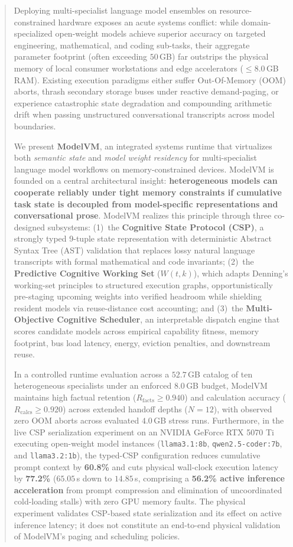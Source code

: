 \begin{abstract}
Deploying multi-specialist language model ensembles on resource-constrained hardware exposes an acute systems conflict: while domain-specialized open-weight models achieve superior accuracy on targeted engineering, mathematical, and coding sub-tasks, their aggregate parameter footprint (often exceeding $50$\,GB) far outstrips the physical memory of local consumer workstations and edge accelerators ($\le 8.0$\,GB RAM). Existing execution paradigms either suffer Out-Of-Memory (OOM) aborts, thrash secondary storage buses under reactive demand-paging, or experience catastrophic state degradation and compounding arithmetic drift when passing unstructured conversational transcripts across model boundaries. 

We present \textbf{ModelVM}, an integrated systems runtime that virtualizes both \textit{semantic state} and \textit{model weight residency} for multi-specialist language model workflows on memory-constrained devices. ModelVM is founded on a central architectural insight: \textbf{heterogeneous models can cooperate reliably under tight memory constraints if cumulative task state is decoupled from model-specific representations and conversational prose}. ModelVM realizes this principle through three co-designed subsystems: (1)~the \textbf{Cognitive State Protocol (CSP)}, a strongly typed 9-tuple state representation with deterministic Abstract Syntax Tree (AST) validation that replaces lossy natural language transcripts with formal mathematical and code invariants; (2)~the \textbf{Predictive Cognitive Working Set} ($W(t, k)$), which adapts Denning's working-set principles to structured execution graphs, opportunistically pre-staging upcoming weights into verified headroom while shielding resident models via reuse-distance cost accounting; and (3)~the \textbf{Multi-Objective Cognitive Scheduler}, an interpretable dispatch engine that scores candidate models across empirical capability fitness, memory footprint, bus load latency, energy, eviction penalties, and downstream reuse. 

In a controlled runtime evaluation across a $52.7$\,GB catalog of ten heterogeneous specialists under an enforced $8.0$\,GB budget, ModelVM maintains high factual retention ($R_{\text{facts}} \ge 0.940$) and calculation accuracy ($R_{\text{calcs}} \ge 0.920$) across extended handoff depths ($N=12$), with observed zero OOM aborts across evaluated $4.0$\,GB stress runs. Furthermore, in the live CSP serialization experiment on an NVIDIA GeForce RTX 5070 Ti executing open-weight model instances (\texttt{llama3.1:8b}, \texttt{qwen2.5-coder:7b}, and \texttt{llama3.2:1b}), the typed-CSP configuration reduces cumulative prompt context by \textbf{60.8\%} and cuts physical wall-clock execution latency by \textbf{77.2\%} ($65.05$\,s down to $14.85$\,s, comprising a \textbf{56.2\% active inference acceleration} from prompt compression and elimination of uncoordinated cold-loading stalls) with zero GPU memory faults. The physical experiment validates CSP-based state serialization and its effect on active inference latency; it does not constitute an end-to-end physical validation of ModelVM's paging and scheduling policies.
\end{abstract}

